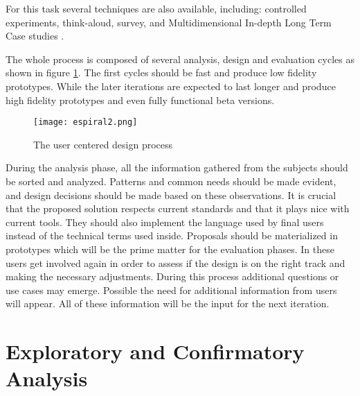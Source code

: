 For this task several techniques are also available, including: controlled experiments, think-aloud, survey, and Multidimensional In-depth Long Term Case studies \autocite{shneiderman_strategies_2006}.

\smallskip

The whole process is composed of several analysis, design and evaluation cycles as shown in figure \ref{intro_spiral}. The first cycles should be fast and produce low fidelity prototypes. While the later iterations are expected to last longer and produce high fidelity prototypes and even fully functional beta versions. 

\begin{figure}
\centering
\texttt{[image: espiral2.png]} 
\caption{ \label{intro_spiral} The user centered design process}
\end{figure}

During the analysis phase, all the information gathered from the subjects should be sorted and analyzed. Patterns and common needs should be made evident, and design decisions should be made based on these observations. It is crucial that the proposed solution respects current standards and that it plays nice with current tools. They should also implement the language used by final users instead of the technical terms used inside.  Proposals should be materialized in prototypes which will be the prime matter for the evaluation phases. In these users get involved again in order to assess if the design is on the right track and making the necessary adjustments. During this process additional questions or use cases may emerge. Possible the need for additional information from users will appear. All of these information will be the input for the next iteration.


\section{Exploratory and Confirmatory Analysis}

